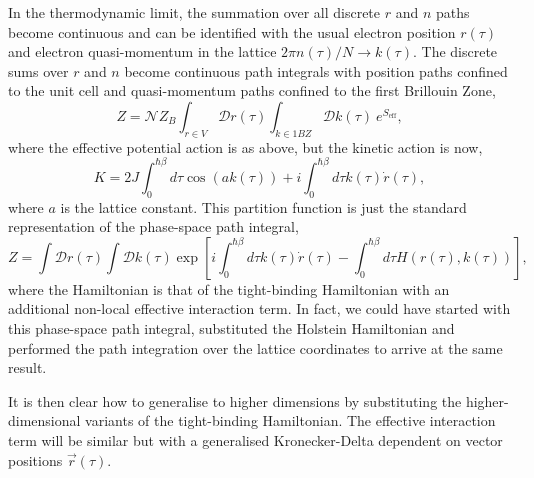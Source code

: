 In the thermodynamic limit, the summation over all discrete $r$ and $n$ paths become continuous and can be identified with the usual electron position $r(\tau)$ and electron quasi-momentum in the lattice $ 
2\pi n(\tau) / N \rightarrow k(\tau)$. The discrete sums over $r$ and $n$ become continuous path integrals with position paths confined to the unit cell and quasi-momentum paths confined to the first Brillouin Zone,
\begin{equation}
    Z = \mathcal{N} Z_B \int_{r \in V} \mathcal{D}r(\tau) \int_{k \in 1BZ} \mathcal{D} k(\tau)\ e^{S_{\text{eff}}} ,
\end{equation}
where the effective potential action is as above, but the kinetic action is now,
\begin{equation}
    K = 2 J \int_0^{\hbar\beta} d\tau \cos{(a k(\tau))} + i \int_0^{\hbar\beta} d\tau k(\tau) \Dot{r}(\tau) ,
\end{equation}
where $a$ is the lattice constant. This partition function is just the standard representation of the phase-space path integral,
\begin{equation}
    Z = \int \mathcal{D}r(\tau) \int \mathcal{D}k(\tau) \exp \left[i \int_0^{\hbar\beta} d\tau k(\tau) \Dot{r}(\tau) - \int_0^{\hbar\beta} d\tau H(r(\tau), k(\tau)) \right] ,
\end{equation}
where the Hamiltonian is that of the tight-binding Hamiltonian with an additional non-local effective interaction term. In fact, we could have started with this phase-space path integral, substituted the Holstein Hamiltonian and performed the path integration over the lattice coordinates to arrive at the same result. 

It is then clear how to generalise to higher dimensions by substituting the higher-dimensional variants of the tight-binding Hamiltonian. The effective interaction term will be similar but with a generalised Kronecker-Delta dependent on vector positions $\Vec{r}(\tau)$.

